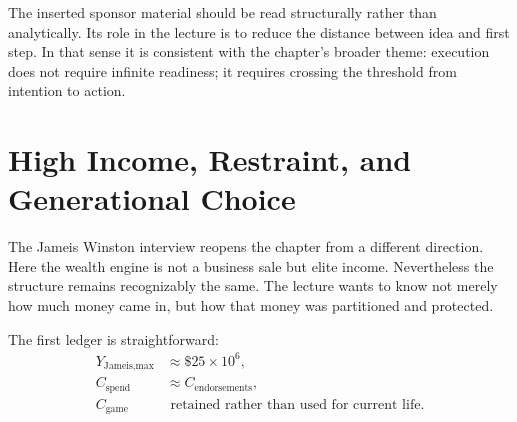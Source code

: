 \begin{figure}
\centering
{}
\end{figure}

The inserted sponsor material should be read structurally rather than analytically. Its role in the lecture is to reduce the distance between idea and first step. In that sense it is consistent with the chapter's broader theme: execution does not require infinite readiness; it requires crossing the threshold from intention to action.

\section{High Income, Restraint, and Generational Choice}

The Jameis Winston interview reopens the chapter from a different direction. Here the wealth engine is not a business sale but elite income. Nevertheless the structure remains recognizably the same. The lecture wants to know not merely how much money came in, but how that money was partitioned and protected.

The first ledger is straightforward:
\begin{align}
Y_{\text{Jameis,max}}&\approx \$25\times 10^6,\\
C_{\text{spend}}&\approx C_{\text{endorsements}},\\
C_{\text{game}}&\text{ retained rather than used for current life.}
\end{align}


